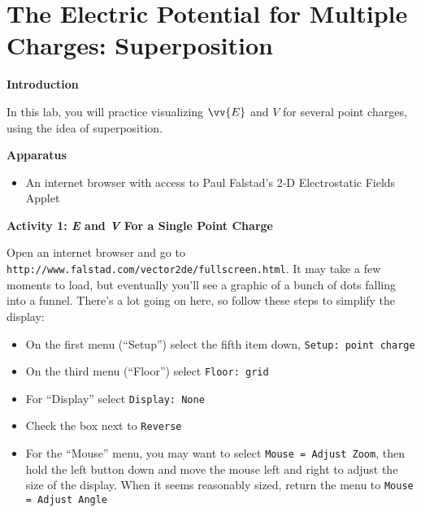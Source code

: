 \section{The Electric Potential for Multiple Charges: Superposition}
\label{potential_superposition}
\begin{comment}
This lab was written by Matt Trawick in January, 2017.  The idea is to get some practice in thinking about V(x,y) as a function in two dimensions, and to think more about how E and V are related.

\end{comment}

\makelabheader %

\bigskip

\textbf{Introduction} 

In this lab, you will practice visualizing $\vv{E}$ and $V$ for several point charges, using the idea of superposition.

\textbf{Apparatus}

\begin{itemize}[nosep]
\item An internet browser with access to Paul Falstad's 2-D Electrostatic Fields Applet
\end{itemize}

\bigskip

\textbf{Activity 1: \textit{E} and \textit{V} For a Single Point Charge}

Open an internet browser and go to \verb!http://www.falstad.com/vector2de/fullscreen.html!.  It may take a few moments to load, but eventually you'll see a graphic of a bunch of dots falling into a funnel.  There's a lot going on here, so follow these steps to simplify the display:
\begin{itemize}[nosep]
\item On the first menu (``Setup'') select the fifth item down, \verb!Setup: point charge!
\item On the third menu (``Floor'') select \verb!Floor: grid!
\item For ``Display'' select \verb!Display: None!
\item Check the box next to \verb!Reverse!
\item For the ``Mouse'' menu, you may want to select \verb!Mouse = Adjust Zoom!, then hold the left button down and move the mouse left and right to adjust the size of the display.  When it seems reasonably sized, return the menu to \verb!Mouse = Adjust Angle!
\end{itemize}

